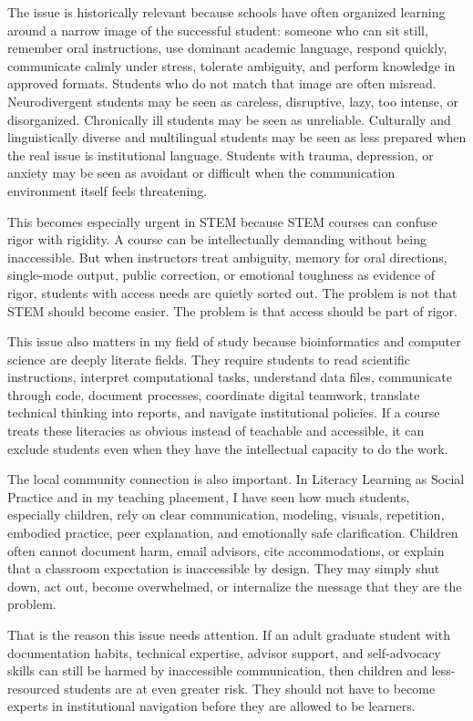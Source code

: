 The issue is historically relevant because schools have often organized learning around a narrow image of the successful student: someone who can sit still, remember oral instructions, use dominant academic language, respond quickly, communicate calmly under stress, tolerate ambiguity, and perform knowledge in approved formats. Students who do not match that image are often misread. Neurodivergent students may be seen as careless, disruptive, lazy, too intense, or disorganized. Chronically ill students may be seen as unreliable. Culturally and linguistically diverse and multilingual students may be seen as less prepared when the real issue is institutional language. Students with trauma, depression, or anxiety may be seen as avoidant or difficult when the communication environment itself feels threatening.

This becomes especially urgent in STEM because STEM courses can confuse rigor with rigidity. A course can be intellectually demanding without being inaccessible. But when instructors treat ambiguity, memory for oral directions, single-mode output, public correction, or emotional toughness as evidence of rigor, students with access needs are quietly sorted out. The problem is not that STEM should become easier. The problem is that access should be part of rigor.

This issue also matters in my field of study because bioinformatics and computer science are deeply literate fields. They require students to read scientific instructions, interpret computational tasks, understand data files, communicate through code, document processes, coordinate digital teamwork, translate technical thinking into reports, and navigate institutional policies. If a course treats these literacies as obvious instead of teachable and accessible, it can exclude students even when they have the intellectual capacity to do the work.

The local community connection is also important. In Literacy Learning as Social Practice and in my teaching placement, I have seen how much students, especially children, rely on clear communication, modeling, visuals, repetition, embodied practice, peer explanation, and emotionally safe clarification. Children often cannot document harm, email advisors, cite accommodations, or explain that a classroom expectation is inaccessible by design. They may simply shut down, act out, become overwhelmed, or internalize the message that they are the problem.

That is the reason this issue needs attention. If an adult graduate student with documentation habits, technical expertise, advisor support, and self-advocacy skills can still be harmed by inaccessible communication, then children and less-resourced students are at even greater risk. They should not have to become experts in institutional navigation before they are allowed to be learners.


